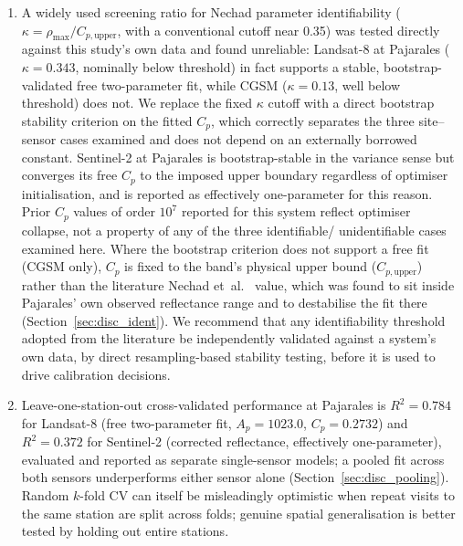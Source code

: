 \documentclass[remotesensing,article,submit,pdftex,moreauthors]{Definitions/mdpi}
\begin{document}
\begin{enumerate}
 
    \item A widely used screening ratio for Nechad parameter
    identifiability ($\kappa = \rho_{\max}/C_{p,\mathrm{upper}}$, with a
    conventional cutoff near 0.35) was tested directly against this
    study's own data and found unreliable: Landsat-8 at Pajarales
    ($\kappa = 0.343$, nominally below threshold) in fact supports a
    stable, bootstrap-validated free two-parameter fit, while CGSM
    ($\kappa = 0.13$, well below threshold) does not. We replace the
    fixed $\kappa$ cutoff with a direct bootstrap stability criterion
    on the fitted $C_p$, which correctly separates the three
    site--sensor cases examined and does not depend on an externally
    borrowed constant. Sentinel-2 at Pajarales is bootstrap-stable in
    the variance sense but converges its free $C_p$ to the imposed
    upper boundary regardless of optimiser initialisation, and is
    reported as effectively one-parameter for this reason. Prior $C_p$
    values of order $10^7$ reported for this system reflect optimiser
    collapse, not a property of any of the three identifiable/
    unidentifiable cases examined here. Where the bootstrap criterion
    does not support a free fit (CGSM only), $C_p$ is fixed to the
    band's physical upper bound ($C_{p,\mathrm{upper}}$) rather than
    the literature Nechad et~al.\ \citeyearpar{NECHAD2010854} value,
    which was found to sit inside Pajarales' own observed reflectance
    range and to destabilise the fit there
    (Section~\ref{sec:disc_ident}). We recommend that any identifiability
    threshold adopted from the literature be independently validated
    against a system's own data, by direct resampling-based stability
    testing, before it is used to drive calibration decisions.
 
    \item Leave-one-station-out cross-validated performance at
    Pajarales is $R^2 = 0.784$ for Landsat-8 (free two-parameter fit,
    $A_p=1023.0$, $C_p=0.2732$) and $R^2 = 0.372$ for
    Sentinel-2 (corrected reflectance, effectively one-parameter), evaluated and reported as
    separate single-sensor models; a pooled fit across both sensors
    underperforms either sensor alone (Section~\ref{sec:disc_pooling}).
    Random $k$-fold CV can itself be misleadingly optimistic when
    repeat visits to the same station are split across folds; genuine
    spatial generalisation is better tested by holding out entire
    stations.
 

\end{enumerate}
\end{document}
